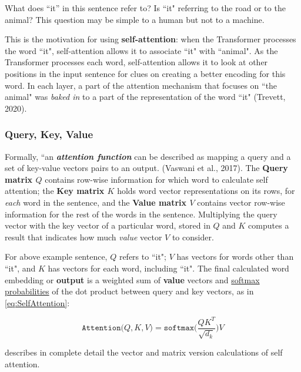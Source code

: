 What does ``it” in this sentence refer to? Is ``it" referring to the road or to the animal? This question may be simple to a human but not to a machine.  

This is the motivation for using \textbf{self-attention}: when the Transformer processes the word ``it", self-attention allows it to associate ``it" with ``animal". As the Transformer processes each word, self-attention allows it to look at other positions in the input sentence for clues on creating a better encoding for this word. In each layer, a part of the attention mechanism that focuses on ``the animal" was \emph{baked in} to a part of the representation of the word ``it" (Trevett, 2020). 


\subsubsection{Query, Key, Value} \label{sec:QKV}

Formally, ``an \textbf{\textit{attention function}} can be described as mapping a query and a set of key-value vectors pairs to an output. (Vaswani et al., 2017). The \textbf{Query matrix $Q$} contains row-wise information for which word to calculate self attention; the \textbf{Key matrix $K$} holds word vector representations on its rows, for \emph{each} word in the sentence, and the \textbf{Value matrix $V$} contains vector row-wise information for the rest of the words in the sentence. Multiplying the query vector with the key vector of a particular word, stored in $Q$ and $K$ computes a result that indicates how much \emph{value} vector $V$ to consider.

For above example sentence, $Q$ refers to ``it"; $V$ has vectors for words other than ``it", and $K$ has vectors for each word, including ``it".  The final calculated word embedding or \textbf{output} is a weighted sum of \textbf{value} vectors and \hyperref[cnc:softmaxLayer]{softmax probabilities} of the dot product between query and key vectors, as in \cref{eq:SelfAttention}:

\vspace{-5pt}

\begin{equation}
\texttt{Attention} \Big(Q, K, V \Big) = \texttt{softmax} \Bigg(\frac {QK^T} {\sqrt{d_k}} \Bigg) V
\label{eq:SelfAttention}
\end{equation}

 describes in complete detail the vector and matrix version calculations of self attention. 


